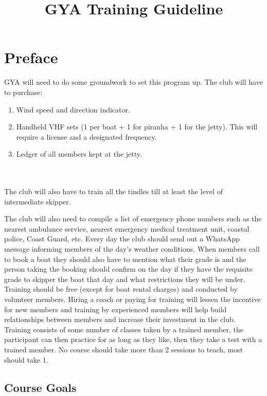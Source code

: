 \documentclass[12pt]{scrartcl}
\title{GYA Training Guideline}
\date{}
\begin{document}
\maketitle

\thispagestyle{empty}

\tableofcontents

\newpage

\section{Preface} \label{sec:preface}

GYA will need to do some groundwork to set this program up. The club will have to purchase:

\label{list:purchases}
\begin{enumerate}
\item Wind speed and direction indicator.
\item Handheld VHF sets (1 per boat + 1 for piranha + 1 for the jetty). This will require a license and a designated frequency.
\item Ledger of all members kept at the jetty.
\end{enumerate}
\\
\\
The club will also have to train all the tindles till at least the level of intermediate skipper.

The club will also need to compile a list of emergency phone numbers such as the nearest ambulance service, nearest emergency medical treatment unit, coastal police, Coast Guard, etc.
Every day the club should send out a WhatsApp message informing members of the day’s weather conditions. When members call to book a boat they should also have to
mention what their grade is and the person taking the booking should confirm on the
day if they have the requisite grade to skipper the boat that day and what restrictions
they will be under.
Training should be free (except for boat rental charges) and conducted by volunteer
members. Hiring a coach or paying for training will lessen the incentive for new members
and training by experienced members will help build relationships between members and
increase their investment in the club.
Training consists of some number of classes taken by a trained member, the participant
can then practice for as long as they like, then they take a test with a trained member.
No course should take more than 2 sessions to teach, most should take 1.

\subsection{Course Goals} \label{subsec:goals}
\end{document}
